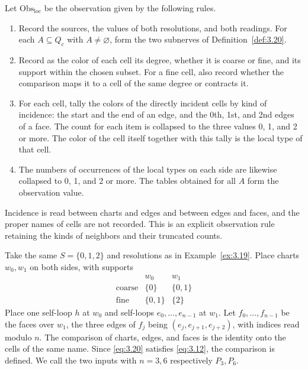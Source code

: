 \begin{definition}\label{def:3.26}

Let $\mathrm{Obs}_{\mathrm{loc}}$ be the observation given by the following rules.

\begin{enumerate}
\item Record the sources, the values of both resolutions, and both readings.
For each $A\subseteq Q_c$ with $A\ne\varnothing$, form the two subnerves of
Definition~\ref{def:3.20}.
\item Record as the color of each cell its degree, whether it is coarse or fine, and
its support within the chosen subset.
For a fine cell, also record whether the comparison maps it to a cell of the same
degree or contracts it.
\item For each cell, tally the colors of the directly incident cells by kind of
incidence: the start and the end of an edge, and the 0th, 1st, and 2nd edges of a
face.
The count for each item is collapsed to the three values 0, 1, and 2 or more.
The color of the cell itself together with this tally is the local type of that
cell.
\item The numbers of occurrences of the local types on each side are likewise
collapsed to 0, 1, and 2 or more.
The tables obtained for all $A$ form the observation value.
\end{enumerate}

Incidence is read between charts and edges and between edges and faces, and the
proper names of cells are not recorded.
This is an explicit observation rule retaining the kinds of neighbors and their
truncated counts.

\end{definition}

\begin{construction}\label{cons:3.27}

Take the same $S=\{0,1,2\}$ and resolutions as in Example~\ref{ex:3.19}.
Place charts $w_0,w_1$ on both sides, with supports
\begin{equation*}
\begin{array}{c|cc}
&w_0&w_1\\ \hline
\text{coarse}&\{0\}&\{0,1\}\\
\text{fine}&\{0,1\}&\{2\}
\end{array}
\tag{3.20}\label{eq:3.20}
\end{equation*}
Place one self-loop $h$ at $w_0$ and self-loops $e_0,\ldots,e_{n-1}$ at $w_1$.
Let $f_0,\ldots,f_{n-1}$ be the faces over $w_1$, the three edges of $f_j$ being
$(e_j,e_{j+1},e_{j+2})$, with indices read modulo $n$.
The comparison of charts, edges, and faces is the identity onto the cells of the
same name.
Since \eqref{eq:3.20} satisfies \eqref{eq:3.12}, the comparison is defined.
We call the two inputs with $n=3,6$ respectively $P_3,P_6$.

\end{construction}

